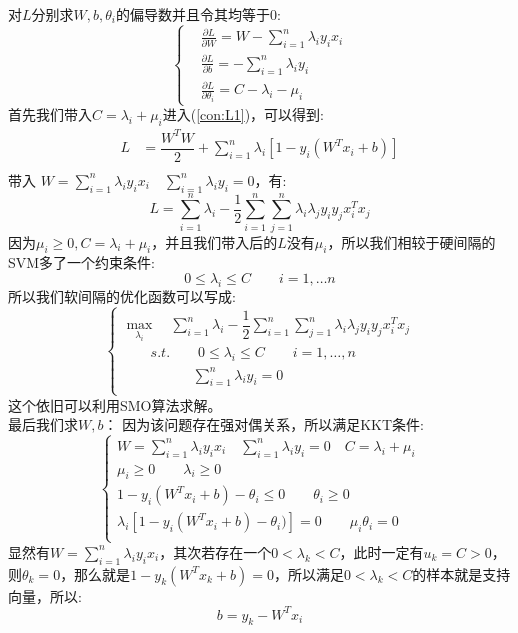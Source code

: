 \documentclass[withoutpreface,bwprint]{cumcmthesis} %
\begin{document}
 	对$L$分别求$W,b,\theta_i$的偏导数并且令其均等于$0$:
 	\begin{equation}
 		\begin{cases}
 			& \frac{\partial L}{\partial W}=W-\sum_{i=1}^{n}\lambda_i y_i x_i \\
 			& \frac{\partial L}{\partial b}=-\sum_{i=1}^{n} \lambda_i y_i   \\
 			& \frac{\partial L}{\partial \theta_i}=C-\lambda_i-\mu_i
 		\end{cases}
 	\end{equation}
 	首先我们带入$C=\lambda_i+\mu_i$进入(\ref{con:L1})，可以得到:
 	\begin{align*}
 		L & =\dfrac{W^TW}{2}+\sum_{i=1}^{n}\lambda_i \left[ 1-y_i\left( W^Tx_i+b \right)\right]\\
 	\end{align*}
 	 \indent 带入 $W=\sum_{i=1}^{n}\lambda_i y_i x_i \quad \sum_{i=1}^{n} \lambda_i y_i=0$，有:
 	 \begin{equation*}
 	 	L= \sum_{i=1}^{n}\lambda_i -\dfrac{1}{2} \sum_{i=1}^{n}\sum_{j=1}^{n} \lambda_i \lambda_j y_i y_j x_i^T x_j
 	 \end{equation*}
  		因为$\mu_i \geq 0,C=\lambda_i+\mu_i$，并且我们带入后的$L$没有$\mu_i$，所以我们相较于硬间隔的SVM多了一个约束条件:
  	\begin{equation}
  			0 \leq \lambda_i \leq C \quad \quad i=1,\ldots n
  	\end{equation}
  	所以我们软间隔的优化函数可以写成:
  		\begin{equation}
  		\begin{cases}
  			\mathop{max} \limits_{\lambda_i} \quad \sum_{i=1}^{n}\lambda_i -\dfrac{1}{2} \sum_{i=1}^{n}\sum_{j=1}^{n} \lambda_i \lambda_j y_i y_j x_i^T x_j
  			\\
  			\quad \quad s.t.\quad \quad  0 \leq \lambda_i \leq C \quad \quad i=1,\ldots,n \\
  			\quad \quad \quad \quad \quad \sum_{i=1}^{n} \lambda_i y_i=0\\
  		\end{cases}
  	\end{equation}
  	这个依旧可以利用SMO算法求解。\\
  	最后我们求$W,b$：
  	因为该问题存在强对偶关系，所以满足KKT条件:
  	\begin{equation}
  		\begin{cases}
  			W=\sum_{i=1}^{n}\lambda_i y_i x_i \quad \sum_{i=1}^{n} \lambda_i y_i=0 \quad C=\lambda_i+\mu_i \\
  			\mu_i \geq 0 \quad \quad \lambda_i \geq 0 \\
  			1-y_i(W^Tx_i+b)-\theta_i \leq 0 \quad \quad  \theta_i \geq 0 \\
  			\lambda_i\left[  1-y_i(W^Tx_i+b) -\theta_i ) \right]=0 \quad \quad \mu_i\theta_i=0\\ 			
  		\end{cases}
  	\end{equation}
  	显然有$W=\sum_{i=1}^{n}\lambda_i y_i x_i$，其次若存在一个$ 0<\lambda_k<C$，此时一定有$u_k=C>0$，则$\theta_k=0$，那么就是$1-y_k(W^Tx_k+b)=0$，所以满足$0<\lambda_k<C$的样本就是支持向量，所以:
  	\begin{equation}
  		b=y_k-W^Tx_i
  	\end{equation}
\end{document}
